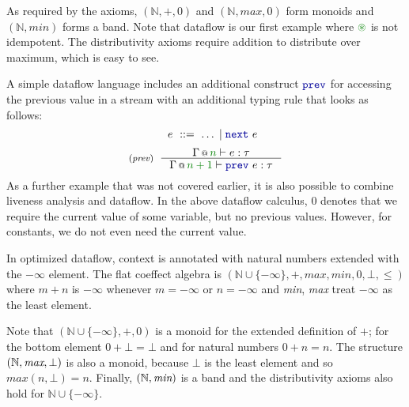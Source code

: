 As required by the axioms, $(\mathbb{N}, +, 0)$ and $(\mathbb{N}, \mathit{max}, 0)$ form monoids
and $(\mathbb{N}, \mathit{min})$ forms a band. Note that dataflow is our first example where
$\cseq$ is not idempotent. The distributivity axioms require addition to distribute over maximum,
which is easy to see.

A simple dataflow language includes an additional construct $\kvd{prev}$ for accessing the
previous value in a stream with an additional typing rule that looks as follows:
%
\begin{equation*}
\quad~ e ~::=~ \ldots \sep \kvd{next}~e
\end{equation*}
\begin{equation*}
\tyrule{prev}
  { \coctx{\Gamma}{\cclrd{n}} \vdash e : \tau }
  { \coctx{\Gamma}{\cclrd{n+1}} \vdash \kvd{prev}~e : \tau }
\end{equation*}
%
As a further example that was not covered earlier, it is also possible to combine liveness analysis
and dataflow. In the above dataflow calculus, $0$ denotes that we require the current value of some
variable, but no previous values. However, for constants, we do not even need the current value.

\begin{example}
In optimized dataflow, context is annotated with natural numbers extended with the $-\infty$ element.
The flat coeffect algebra is $(\mathbb{N} \cup \{-\infty\}, +, \mathit{max}, \mathit{min}, 0, \bot, \leq)$
where $m + n$ is $-\infty$ whenever $m=-\infty$ or $n=-\infty$ and \emph{min}, \emph{max} treat $-\infty$ as the
least element.
\end{example}

\noindent
Note that $(\mathbb{N}\cup\{-\infty\}, +, 0)$ is a monoid for the extended definition of $+$; for the
bottom element $0 + \bot = \bot$ and for natural numbers $0 + n = n$. The structure
$(\mathbb{N}, \emph{max}, \bot)$ is also a monoid, because $\bot$ is the least element and so
$\mathit{max}(n, \bot) = n$. Finally,  $(\mathbb{N}, \emph{min})$ is a band and the distributivity 
axioms also hold for $\mathbb{N}\cup\{-\infty\}$.


%
%

